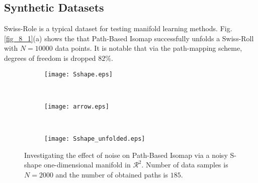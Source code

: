 \documentclass[10pt,journal,cspaper,compsoc]{IEEEtran}
\let\MYoriglatexcaption\caption
\renewcommand{\caption}[2][\relax]{\MYoriglatexcaption[#2]{#2}}
\begin{document}
\subsection{Synthetic Datasets}
Swiss-Role is a typical dataset for testing manifold learning methods. Fig.\ref{fig_8_1}(a) shows the that Path-Based Isomap successfully unfolds a Swiss-Roll with $N=10000$ data points. It is notable that via the path-mapping scheme, degrees of freedom is dropped $82\%$. 

\begin{figure}[b]
\centering
        \begin{subfigure}[b]{0.35\textwidth}
                \texttt{[image: Sshape.eps]}
\end{subfigure}\\ \vspace{1mm}
        \begin{subfigure}[b]{0.2\textwidth}
        \begin{center}
                \texttt{[image: arrow.eps]}
\end{center}
        \end{subfigure}\\\begin{subfigure}[b]{0.35\textwidth}
                \texttt{[image: Sshape\_unfolded.eps]}
        \end{subfigure}\label{fig_Sshape}
        \vspace{5mm}
        \caption{{\small Investigating the effect of noise on Path-Based Isomap via a noisy S-shape one-dimensional manifold in $\mathcal{R}^2$. Number of data samples is $N=2000$ and the number of obtained paths is $185$.}}
\end{figure}
\end{document}
